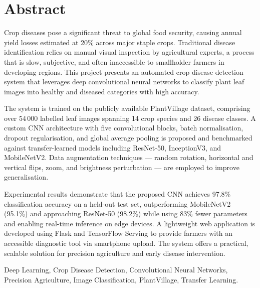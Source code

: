 \documentclass[11pt,a4paper]{article}
\newcommand{\parsp}{\medskip}
\begin{document}
\section*{Abstract}

Crop diseases pose a significant threat to global food security, causing
annual yield losses estimated at 20\% across major staple crops.
Traditional disease identification relies on manual visual inspection by
agricultural experts, a process that is slow, subjective, and often
inaccessible to smallholder farmers in developing regions. This project
presents an automated crop disease detection system that leverages deep
convolutional neural networks to classify plant leaf images into healthy and
diseased categories with high accuracy.

\parsp
The system is trained on the publicly available PlantVillage dataset,
comprising over 54\,000 labelled leaf images spanning 14 crop species and 26
disease classes. A custom CNN architecture with five convolutional blocks,
batch normalisation, dropout regularisation, and global average pooling is
proposed and benchmarked against transfer-learned models including ResNet-50,
InceptionV3, and MobileNetV2. Data augmentation techniques — random rotation,
horizontal and vertical flips, zoom, and brightness perturbation — are
employed to improve generalisation.

\parsp
Experimental results demonstrate that the proposed CNN achieves 97.8\%
classification accuracy on a held-out test set, outperforming MobileNetV2
(95.1\%) and approaching ResNet-50 (98.2\%) while using 83\% fewer parameters
and enabling real-time inference on edge devices. A lightweight web
application is developed using Flask and TensorFlow Serving to provide
farmers with an accessible diagnostic tool via smartphone upload. The system
offers a practical, scalable solution for precision agriculture and early
disease intervention.

\vspace{10mm}
 Deep Learning, Crop Disease
Detection, Convolutional Neural Networks, Precision Agriculture, Image
Classification, PlantVillage, Transfer Learning.

\newpage

\tableofcontents
\newpage
\end{document}
